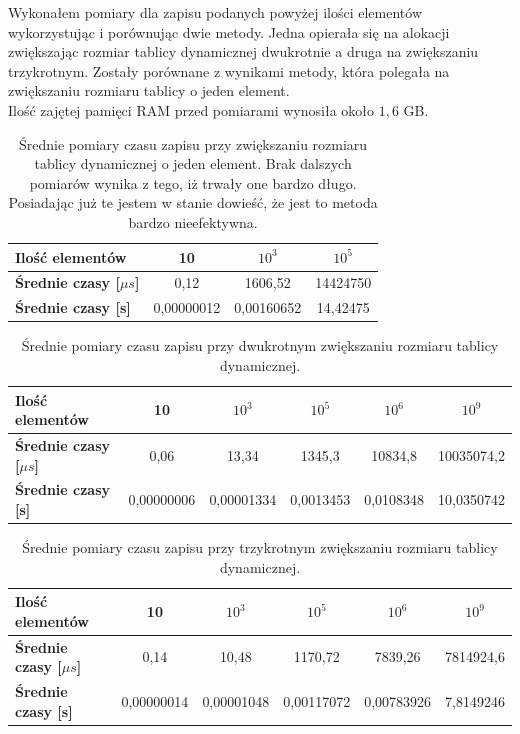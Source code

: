\documentclass[11pt,a4paper]{article}
\begin{document}
\hspace{4ex}Wykonałem pomiary dla zapisu podanych powyżej ilości elementów wykorzystując i porównując dwie metody. Jedna opierała się na alokacji zwiększając rozmiar tablicy dynamicznej dwukrotnie a druga na zwiększaniu trzykrotnym. Zostały porównane z wynikami metody, która polegała na zwiększaniu rozmiaru tablicy o jeden element.\\

Ilość zajętej pamięci RAM przed pomiarami wynosiła około $1,6$ GB.

\newpage

\begin{table}[h!]
\centering
\label{my-label1}
	\begin{tabular}{| l | c | c | c |}
	\hline
	\textbf{Ilość elementów} & 10 & $10^3$ & $10^5$ \\ \hline
	\textbf{Średnie czasy {[}$\mu s${]} } & 0,12 & 1606,52 &	14424750 \\ \hline
	\textbf{Średnie czasy {[}s{]} } & 0,00000012	& 0,00160652 & 14,42475 \\ \hline
	\end{tabular}
	\caption{Średnie pomiary czasu zapisu przy zwiększaniu rozmiaru tablicy dynamicznej o jeden element. Brak dalszych pomiarów wynika z tego, iż trwały one bardzo długo. Posiadając już te jestem w stanie dowieść, że jest to metoda bardzo nieefektywna.}
\end{table}

\bigskip
\bigskip

\begin{table}[h!]
\centering
\label{my-label2}
	\begin{tabular}{| l | c | c | c | c | c |}
	\hline
	\textbf{Ilość elementów} & 10 & $10^3$ & $10^5$ & $10^6$ & $10^9$ \\ \hline
	\textbf{Średnie czasy {[}$\mu s${]} } & 0,06       & 13,34      & 1345,3    & 10834,8   & 		10035074,2 \\ \hline
	\textbf{Średnie czasy {[}s{]} } & 0,00000006 & 0,00001334 & 0,0013453 & 0,0108348 & 	10,0350742 \\ \hline
	\end{tabular}
	\caption{Średnie pomiary czasu zapisu przy dwukrotnym zwiększaniu rozmiaru tablicy dynamicznej.}
\end{table}

\bigskip
\bigskip

\begin{table}[h!]
\centering
\label{my-label3}
	\begin{tabular}{| l | c | c | c | c | c |}
	\hline
	\textbf{Ilość elementów} & 10 & $10^3$ & $10^5$ & $10^6$ & $10^9$ \\ \hline
	\textbf{Średnie czasy {[}$\mu s${]} } & 0,14 & 10,48 & 1170,72 & 7839,26 & 7814924,6 \\ \hline
	\textbf{Średnie czasy {[}s{]} } & 0,00000014	& 0,00001048	& 0,00117072	 & 0,00783926 & 7,8149246 \\ \hline
	\end{tabular}
	\caption{Średnie pomiary czasu zapisu przy trzykrotnym zwiększaniu rozmiaru tablicy dynamicznej.}
\end{table}
\end{document}
